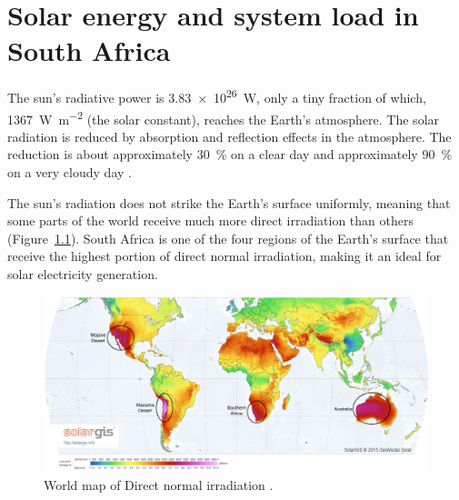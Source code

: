 \chapter{Solar energy and system load in South Africa}\label{Solar power in South Africa}


The sun's radiative power is \SI{3.83e26}{\watt}, only a tiny fraction of which, \SI{1367}{\watt\per\square\metre} (the solar constant), reaches the Earth’s atmosphere. The solar radiation is reduced by absorption and reflection effects in the atmosphere.  The reduction is about approximately \SI{30}{\percent} on a clear day and approximately \SI{90}{\percent} on a very cloudy day \cite{Stine2001a}.

The sun's radiation does not strike the Earth's surface uniformly, meaning that some parts of the world receive much more direct irradiation than others (Figure~\ref{WorldDNI}). South Africa is one of the four regions of the Earth's surface that receive the highest portion of direct normal irradiation, making it an ideal for solar electricity generation.

\begin{figure}[h!] 
\centering
\includegraphics[width=1\linewidth]{FIG/WorldDNI}
\caption[World map of Direct normal irradiation.]{World map of Direct normal irradiation \cite{SolarGIS2015c}.}\label{WorldDNI}
\end{figure}  
\pagebreak
